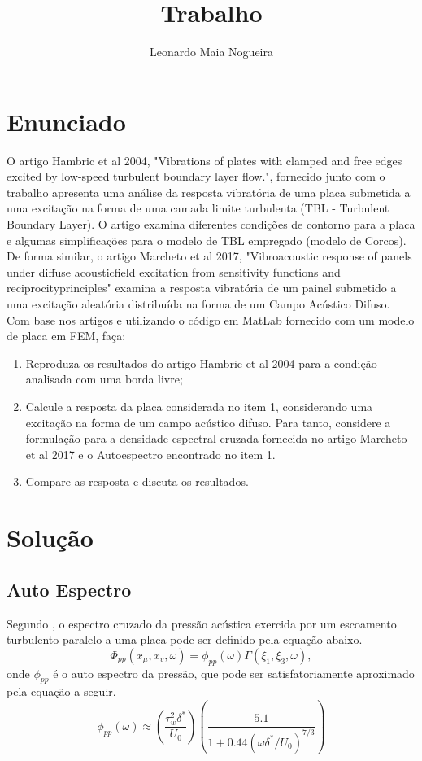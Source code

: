 \documentclass[9pt,a4paper,twoside]{rho-class/rho}
\title{Trabalho}
\author[1]{Leonardo Maia Nogueira}
\begin{document}
	
    \maketitle
    \thispagestyle{firststyle}


\section{Enunciado}
O artigo Hambric et al 2004, "Vibrations of plates with clamped and free edges excited by low-speed
turbulent boundary layer flow.", fornecido junto com o trabalho apresenta uma análise da resposta
vibratória de uma placa submetida a uma excitação na forma de uma camada limite turbulenta (TBL -
Turbulent Boundary Layer). O artigo examina diferentes condições de contorno para a placa e algumas
simplificações para o modelo de TBL empregado (modelo de Corcos).
De forma similar, o artigo Marcheto et al 2017, "Vibroacoustic response of panels under diffuse acousticfield excitation from sensitivity functions and reciprocityprinciples" examina a resposta vibratória de um painel submetido a uma excitação aleatória distribuída na forma de um Campo Acústico Difuso. Com base nos artigos e utilizando o código em MatLab fornecido com um modelo de placa em FEM, faça:

\begin{enumerate}
	\item  Reproduza os resultados do artigo Hambric et al 2004 para a condição analisada com uma borda livre;
	\item Calcule a resposta da placa considerada no item 1, considerando uma excitação na forma de um campo acústico difuso. Para tanto, considere a formulação para a densidade espectral cruzada fornecida no artigo Marcheto et al 2017 e o Autoespectro encontrado no item 1.
	\item Compare as resposta e discuta os resultados.
\end{enumerate}

\section{Solução}
\subsection{Auto Espectro}
Segundo \cite{hambricVibrationsPlatesClamped2004}, o espectro cruzado da pressão acústica exercida por um escoamento turbulento paralelo a uma placa pode ser definido pela equação abaixo.
\begin{equation}
	\Phi_{pp}(x_\mu,x_v,\omega)=\bar{\phi}_{pp}(\omega)\Gamma(\xi_1,\xi_3,\omega),
\end{equation}
onde $\phi_{pp}$ é o auto espectro da pressão, que pode ser satisfatoriamente aproximado pela equação a seguir.
\begin{equation}
	\phi_{pp}(\omega)\approx\left(\frac{\tau_w^2\delta^*}{U_0}\right)\left(\frac{5.1}{1+0.44(\omega\delta^*/U_0)^{7/3}}\right)
\end{equation}
\end{document}

